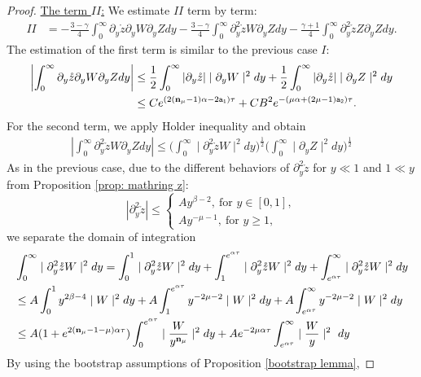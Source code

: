 \documentclass{article}
\newcommand{\ga}{\gamma}
\newcommand{\al}{\alpha}
\newcommand{\pa}{\partial}
\def\beqa{\begin{equation}\begin{aligned}}
\def\eeqa{\end{aligned}\end{equation}}
\def\espz{Z}
\def\espw{W}
\def\epone{\mathtt{a_1}}
\def\eptwo{\mathtt{a_2}}
\def\ndmu{{\bf{n}_{\mu}}}
\numberwithin{equation}{section}
\begin{document}
\begin{proof}
   \noindent \underline{The term $II$:} We estimate $II$ term by term: 
	\begin{align*}
		II 
		&=-\frac{3-\ga}{4} \int_{0}^\infty  \pa_y \mathring z\pa_y \espw \pa_y \espz dy - \frac{3-\ga}{4}\int_{0}^\infty \pa_y^2 \mathring z\espw \pa_y \espz dy- \frac{\ga+1}{4} \int_{0}^\infty \pa_y^2 \mathring z \espz\pa_y \espz dy.
	\end{align*}
    The estimation of the first term is similar to the previous case $I$:   
	\beqa\label{II-2}
		\left| \int_{0}^\infty  \pa_y \mathring z\pa_y \espw \pa_y \espz dy \right|  &\leq \frac12  \int_{0}^\infty | \pa_y \mathring z | \mid\pa_y \espw \mid^2 dy  +\frac12   \int_{0}^\infty | \pa_y \mathring z | \mid\pa_y \espz \mid^2 dy \\
		&\leq C e^{(2(\ndmu-1)\al-2\epone) \tau} + CB^2 e^{-(\mu\al+(2\mu-1)\eptwo)\tau}.
	\eeqa
	For the second term, we apply Holder inequality and obtain
	\begin{align*}
		\left| \int_{0}^\infty \pa_y^2 \mathring z\espw \pa_y \espz dy \right| \leq \Big(\int_{0}^\infty \mid\pa_y^2 \mathring z  \espw\mid^2  dy\Big)^{\frac12} \Big(\int_{0}^\infty\mid\pa_y \espz \mid^2 dy\Big)^{\frac12}
	\end{align*}
	As in the previous case,  
    due to the different behaviors of $\pa_y^2\mathring z$ for $y\ll 1$ and $1\ll y$
	 from Proposition \ref{prop: mathring z}: 
	$$ |\pa_y^2\mathring z|\leq \begin{cases}
		Ay^{\beta-2},\ \text{for } y \in [0,1],\\
		Ay^{-\mu-1},\ \text{for }  y \ge  1,
	\end{cases}$$
	we  separate the domain of integration 
	\begin{align*} 
       &\int_{0}^\infty \mid\pa_y^2 \mathring z\espw\mid^2 dy = \int_0^{1}\mid\pa_y^2 \mathring z\espw\mid^2 dy + \int_{1}^{e^{\al\tau}} \mid\pa_y^2 \mathring z\espw\mid^2 dy +\int_{e^{\al\tau}}^\infty\mid\pa_y^2 \mathring z\espw\mid^2 dy \\
        &\leq A\int_0^{1} y^{2\beta-4} \mid \espw\mid^2 dy +  A\int_{1}^{e^{\al\tau}} y^{-2\mu-2}\mid\espw\mid^2 dy + A\int_{e^{\al\tau}}^\infty y^{-2\mu-2}\mid\espw\mid^2 dy\\
        &\leq A (1+ e^{2(\ndmu-1-\mu)\alpha\tau}) \int_0^{e^{\al\tau}}\mid\frac{\espw}{y^\ndmu}\mid^2 dy + Ae^{-2\mu\al\tau}\int_{e^{\al\tau}}^\infty \mid  \frac{\espw}{y}\mid^2 \ dy
	\end{align*}
   By using 
   the bootstrap assumptions of Proposition  \ref{bootstrap lemma}, 

\end{proof}
\end{document}
